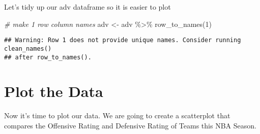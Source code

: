 \documentclass[
]{article}
\newenvironment{Shaded}{\begin{snugshade}}{\end{snugshade}}
\newcommand{\CommentTok}[1]{\textcolor[rgb]{0.56,0.35,0.01}{\textit{#1}}}
\newcommand{\DecValTok}[1]{\textcolor[rgb]{0.00,0.00,0.81}{#1}}
\newcommand{\FunctionTok}[1]{\textcolor[rgb]{0.00,0.00,0.00}{#1}}
\newcommand{\NormalTok}[1]{#1}
\newcommand{\OtherTok}[1]{\textcolor[rgb]{0.56,0.35,0.01}{#1}}
\newcommand{\SpecialCharTok}[1]{\textcolor[rgb]{0.00,0.00,0.00}{#1}}
\newcommand{\StringTok}[1]{\textcolor[rgb]{0.31,0.60,0.02}{#1}}
\begin{document}
Let's tidy up our adv dataframe so it is easier to plot

\begin{Shaded}
\begin{Highlighting}[]
\CommentTok{\# make 1 row column names }
\NormalTok{adv }\OtherTok{\textless{}{-}}\NormalTok{ adv }\SpecialCharTok{\%\textgreater{}\%} \FunctionTok{row\_to\_names}\NormalTok{(}\DecValTok{1}\NormalTok{)}
\end{Highlighting}
\end{Shaded}

\begin{verbatim}
## Warning: Row 1 does not provide unique names. Consider running clean_names()
## after row_to_names().
\end{verbatim}

\begin{Shaded}
\end{Shaded}

\hypertarget{plot-the-data}{%
\section{\texorpdfstring{\textbf{Plot the
Data}}{Plot the Data}}\label{plot-the-data}}

Now it's time to plot our data. We are going to create a scatterplot
that compares the Offensive Rating and Defensive Rating of Teams this
NBA Season.
\end{document}
